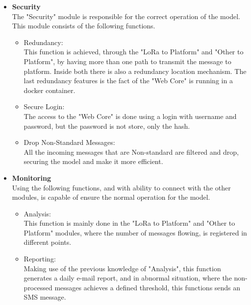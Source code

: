 \begin{itemize}
   \item \textbf{Security} \\
The "Security" module is responsible for the correct operation of the model. This module consists of the following functions.
   \begin{itemize}
     \item Redundancy: \\
      This function is achieved, through the "LoRa to Platform" and "Other to Platform", by having more than one path to transmit the message to platform.
      Inside both there is also a redundancy location mechanism.
      The last redundancy features is the fact of the "Web Core" is running in a docker container. 
   \end{itemize}
   \begin{itemize}
     \item Secure Login:  \\
      The access to the "Web Core" is done using a login with username and password, but the password is not store, only the hash.
   \end{itemize}
   \begin{itemize}
     \item Drop Non-Standard Messages: \\
      All the incoming messages that are Non-standard are filtered and drop, securing the model and make it more efficient.
   \end{itemize}
\end{itemize}

\begin{itemize}
   \item \textbf{Monitoring} \\
   Using the following functions, and with ability to connect with the other modules, is capable of ensure the normal operation for the model.
   \begin{itemize}
     \item Analysis:\\
     This function is mainly done in the "LoRa to Platform" and "Other to Platform" modules, where the number of messages flowing, is registered in different points.
   \end{itemize}
   \begin{itemize}
     \item Reporting: \\
     Making use of the previous knowledge of "Analysis", this function generates a daily e-mail report, and in abnormal situation, where the non-processed messages achieves a defined threshold, this functions sends an SMS message.
   \end{itemize}
\end{itemize}

